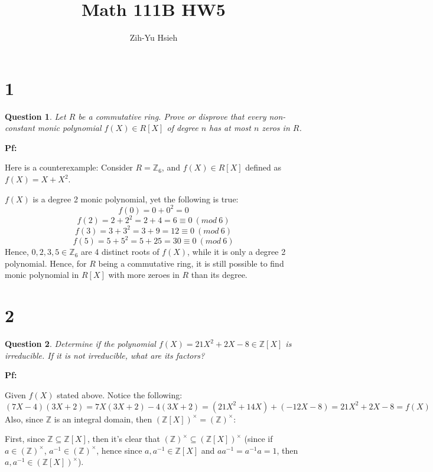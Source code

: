 \documentclass{article}
\title{Math 111B HW5}
\author{Zih-Yu Hsieh}
\newtheorem{question}{Question}
\begin{document}
\maketitle

\section*{1}
\begin{myBox}[]{}
    \begin{question}
        Let $R$ be a commutative ring. Prove or disprove that every non-constant monic
        polynomial $f(X)\in R[X]$ of degree $n$ has at most $n$ zeros in $R$.
    \end{question}
\end{myBox}

\textbf{Pf:}

Here is a counterexample: Consider $R=\mathbb{Z}_6$, and $f(X)\in R[X]$ defined as $f(X)=X+X^2$.

$f(X)$ is a degree 2 monic polynomial, yet the following is true:
$$f(0)=0+0^2=0$$
$$f(2)=2+2^2 = 2+4 = 6 \equiv 0\ (mod\ 6)$$
$$f(3)=3+3^2=3+9=12\equiv 0\ (mod\ 6)$$
$$f(5)=5+5^2=5+25=30\equiv 0\ (mod\ 6)$$
Hence, $0,2,3,5\in\mathbb{Z}_6$ are 4 distinct roots of $f(X)$, while it is only a degree 2 polynomial.
Hence, for $R$ being a commutative ring, it is still possible to find monic polynomial in $R[X]$ with more zeroes in $R$ than its degree.

\hfill

\section*{2}
\begin{myBox}[]{}
    \begin{question}
        Determine if the polynomial $f(X)=21X^2+2X-8\in\mathbb{Z}[X]$ is irreducible. If it is
        not irreducible, what are its factors?
    \end{question}
\end{myBox}

\textbf{Pf:}

Given $f(X)$ stated above. Notice the following: 
$$(7X-4)(3X+2) = 7X(3X+2)-4(3X+2)=(21X^2+14X)+(-12X-8) = 21X^2+2X-8 = f(X)$$
Also, since $\mathbb{Z}$ is an integral domain, then $(\mathbb{Z}[X])^\times = (\mathbb{Z})^\times$:

First, since $\mathbb{Z}\subseteq \mathbb{Z}[X]$, then it's clear that $(\mathbb{Z})^\times \subseteq (\mathbb{Z}[X])^\times$ (since if $a\in(\mathbb{Z})^\times$, $a^{-1}\in(\mathbb{Z})^\times$,
hence since $a,a^{-1}\in\mathbb{Z}[X]$ and $aa^{-1}=a^{-1}a=1$, then $a,a^{-1}\in(\mathbb{Z}[X])^\times$).
\end{document}
